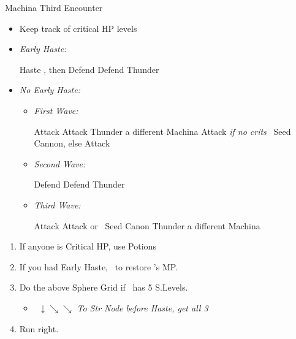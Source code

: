 \begin{battle}{Machina Third Encounter}
    \begin{itemize}
        \item Keep track of critical HP levels
        \item \textit{Early Haste:}
        \begin{itemize}
            \tidusf Haste \lulu, then Defend
            \kimahrif Defend
            \luluf Thunder
        \end{itemize}
        \item \textit{No Early Haste:}
        \begin{itemize}
            \item \textit{First Wave:}
            \begin{itemize}
                \tidusf Attack
                \kimahrif Attack
                \luluf Thunder a different Machina
                \tidusf Attack
                \kimahrif \textit{if no crits} \od\ Seed Cannon, else Attack
            \end{itemize}
            \item \textit{Second Wave:}
            \begin{itemize}
                \tidusf Defend
                \kimahrif Defend
                \luluf Thunder
            \end{itemize}
            \item \textit{Third Wave:}
            \begin{itemize}
                \tidusf Attack
                \kimahrif Attack or \od\ Seed Canon
                \luluf Thunder a different Machina
            \end{itemize}
        \end{itemize}
    \end{itemize}
\end{battle}
\begin{enumerate}[resume]
    \item If anyone is Critical HP, use Potions
    \item If you had Early Haste, \save\ to restore \tidus's MP.
    \item Do the above Sphere Grid if \tidus\ has 5 S.Levels.
    \begin{itemize}
        \item \tidus\ $\downarrow \searrow \searrow$ \textit{To Str Node before Haste, get all 3}
    \end{itemize}
    \item Run right.
\end{enumerate}
